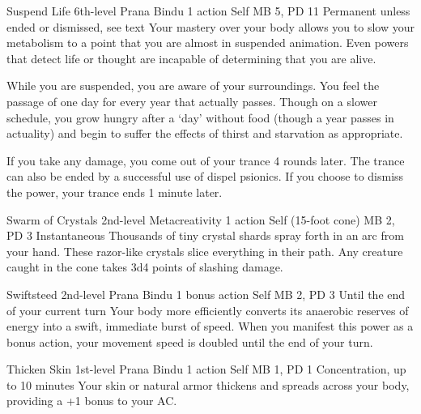 \DndPowerHeader%
  {Suspend Life}
  {6th-level Prana Bindu}
  {1 action}
  {Self}
  {MB 5, PD 11}
  {Permanent unless ended or dismissed, see text}
  Your mastery over your body allows you to slow your
  metabolism to a point
  that you are almost in suspended animation.
  Even powers that detect life or thought are
  incapable of determining that you are alive.

  While you are suspended,
  you are aware of your surroundings.
  You feel the passage of one day
  for every year that actually passes.
  Though on a slower schedule,
  you grow hungry after a `day' without food
  (though a year passes in actuality)
  and begin to suffer the effects of
  thirst and starvation as appropriate.
  
  If you take any damage,
  you come out of your trance 4 rounds later.
  The trance can also be ended by a
  successful use of dispel psionics.
  If you choose to dismiss the power,
  your trance ends 1 minute later.

\DndPowerHeader%
  {Swarm of Crystals}
  {2nd-level Metacreativity}
  {1 action}
  {Self (15-foot cone)}
  {MB 2, PD 3}
  {Instantaneous}
  Thousands of tiny crystal shards spray forth in an arc from your hand.
  These razor-like crystals slice everything in their path.
  Any creature caught in the cone takes 3d4 points of slashing damage.

\DndPowerHeader%
  {Swiftsteed}
  {2nd-level Prana Bindu}
  {1 bonus action}
  {Self}
  {MB 2, PD 3}
  {Until the end of your current turn}
  Your body more efficiently converts its anaerobic
  reserves of energy into a swift, immediate burst of speed.
  When you manifest this power as a bonus action,
  your movement speed is doubled until the end
  of your turn.

\DndPowerHeader%
  {Thicken Skin}
  {1st-level Prana Bindu}
  {1 action}
  {Self}
  {MB 1, PD 1}
  {Concentration, up to 10 minutes}
  Your skin or natural armor thickens
  and spreads across your body,
  providing a +1 bonus to your AC.

